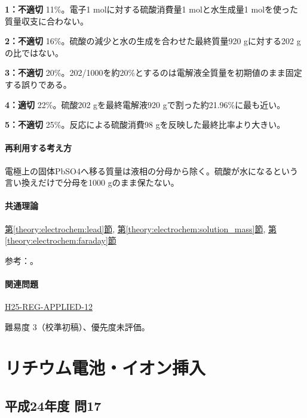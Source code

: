 \noindent\textbf{1：不適切} 11\%。電子1 molに対する硫酸消費量1 molと水生成量1 molを使った質量収支に合わない。\par

\noindent\textbf{2：不適切} 16\%。硫酸の減少と水の生成を合わせた最終質量920 gに対する202 gの比ではない。\par

\noindent\textbf{3：不適切} 20\%。202/1000を約20\%とするのは電解液全質量を初期値のまま固定する誤りである。\par

\noindent\textbf{4：適切} 22\%。硫酸202 gを最終電解液920 gで割った約21.96\%に最も近い。\par

\noindent\textbf{5：不適切} 25\%。反応による硫酸消費98 gを反映した最終比率より大きい。\par

\paragraph{再利用する考え方} 電極上の固体PbSO4へ移る質量は液相の分母から除く。硫酸が水になるという言い換えだけで分母を1000 gのまま保たない。

\paragraph{共通理論} \hyperref[theory:electrochem:lead]{第\ref*{theory:electrochem:lead}節}, \hyperref[theory:electrochem:solution_mass]{第\ref*{theory:electrochem:solution_mass}節}, \hyperref[theory:electrochem:faraday]{第\ref*{theory:electrochem:faraday}節}

\par 参考：\cite{openstax_batteries,mit_redox2014}。

\paragraph{関連問題} \hyperref[q:h25-reg-applied-12]{H25-REG-APPLIED-12}

\par 難易度 3（校準初稿）、優先度未評価。

\section{リチウム電池・イオン挿入}

\subsection{平成24年度 問17}
\label{q:h24-reg-applied-17}

